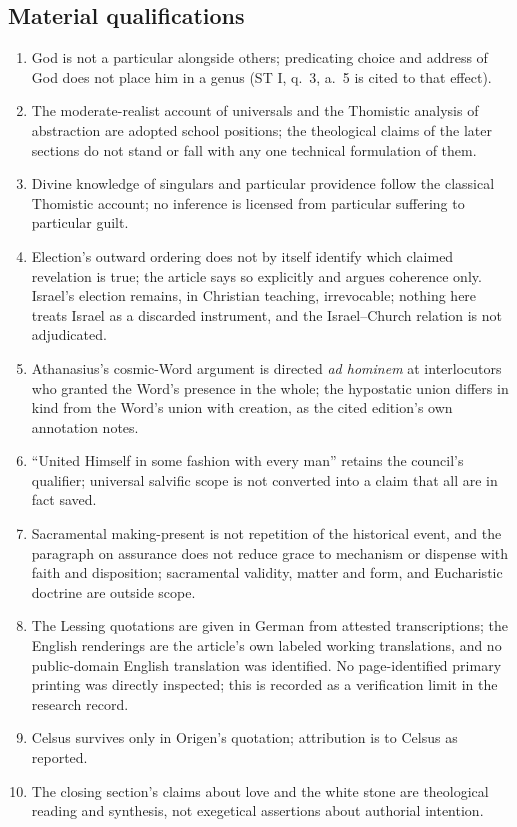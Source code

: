 \subsection{Material qualifications}

\begin{enumerate}
\item God is not a particular alongside others; predicating choice and address of God does not place him in a genus (ST I, q.~3, a.~5 is cited to that effect).
\item The moderate-realist account of universals and the Thomistic analysis of abstraction are adopted school positions; the theological claims of the later sections do not stand or fall with any one technical formulation of them.
\item Divine knowledge of singulars and particular providence follow the classical Thomistic account; no inference is licensed from particular suffering to particular guilt.
\item Election's outward ordering does not by itself identify which claimed revelation is true; the article says so explicitly and argues coherence only. Israel's election remains, in Christian teaching, irrevocable; nothing here treats Israel as a discarded instrument, and the Israel--Church relation is not adjudicated.
\item Athanasius's cosmic-Word argument is directed \emph{ad hominem} at interlocutors who granted the Word's presence in the whole; the hypostatic union differs in kind from the Word's union with creation, as the cited edition's own annotation notes.
\item ``United Himself in some fashion with every man'' retains the council's qualifier; universal salvific scope is not converted into a claim that all are in fact saved.
\item Sacramental making-present is not repetition of the historical event, and the paragraph on assurance does not reduce grace to mechanism or dispense with faith and disposition; sacramental validity, matter and form, and Eucharistic doctrine are outside scope.
\item The Lessing quotations are given in German from attested transcriptions; the English renderings are the article's own labeled working translations, and no public-domain English translation was identified. No page-identified primary printing was directly inspected; this is recorded as a verification limit in the research record.
\item Celsus survives only in Origen's quotation; attribution is to Celsus as reported.
\item The closing section's claims about love and the white stone are theological reading and synthesis, not exegetical assertions about authorial intention.
\end{enumerate}

